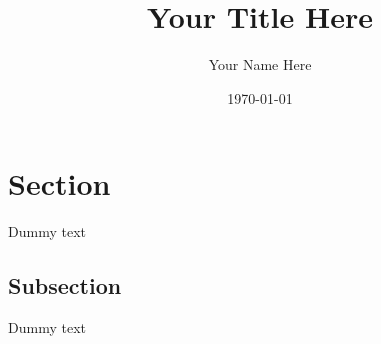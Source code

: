 \documentclass[12pt, a4paper]{article}
\title{Your Title Here}
\author{Your Name Here}
\date{\today}
\begin{document}
    \maketitle
    \tableofcontents
    \newpage


    \section{Section}
    Dummy text

    \subsection{Subsection}
    Dummy text
\end{document}
